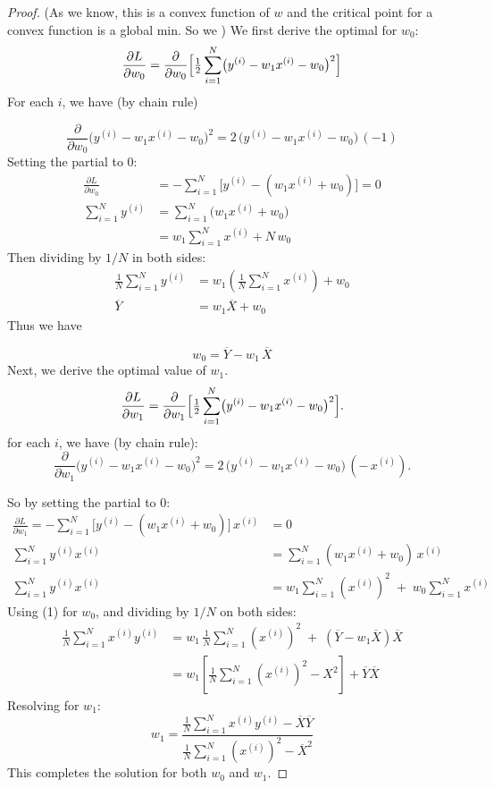 \documentclass[lang=cn,11pt]{elegantbook}
\begin{document}
\begin{proof}
(As we know, this is a convex function of $w$ and the critical point for a convex function is a global min. So we )
We first derive the optimal for $w_0$:
\[
\frac{\partial L}{\partial w_0}
= \frac{\partial}{\partial w_0}
   \Bigl[
       \tfrac{1}{2}\sum_{i=1}^N \bigl(y^{(i)} - w_1 x^{(i)} - w_0\bigr)^2
   \Bigr]
\]
For each \(i\), we have (by chain rule)

\[
\frac{\partial}{\partial w_0}
\bigl(y^{(i)} - w_1 x^{(i)} - w_0\bigr)^2
= 2\,\bigl(y^{(i)} - w_1 x^{(i)} - w_0\bigr)\,(-1)
\]
Setting the partial to 0:
\begin{align}
    \frac{\partial L}{\partial w_0}
&= -\sum_{i=1}^N \bigl[y^{(i)} - (w_1 x^{(i)} + w_0)\bigr] = 0 \\
\sum_{i=1}^N y^{(i)} 
&= \sum_{i=1}^N \bigl(w_1 x^{(i)} + w_0\bigr)\\
& = w_1 \sum_{i=1}^N x^{(i)} + N\,w_0
\end{align}
Then dividing by $1/N$ in both sides:
\begin{align}
    \frac{1}{N}\sum_{i=1}^N y^{(i)} 
&= w_1 (\frac{1}{N}\sum_{i=1}^N x^{(i)}) + w_0 \\
\overline{Y} &=     w_1   \overline{X} + w_0
\end{align}
Thus we have 

\[
w_0 = \overline{Y} - w_1 \, \overline{X}
\tag{1}
\]
Next, we derive the optimal value of $w_1$.
\[
\frac{\partial L}{\partial w_1}
= \frac{\partial}{\partial w_1}
   \Bigl[
       \tfrac{1}{2}\sum_{i=1}^N \bigl(y^{(i)} - w_1 x^{(i)} - w_0\bigr)^2
   \Bigr].
\]
for each \(i\), we have (by chain rule):
\[
\frac{\partial}{\partial w_1}
\bigl(y^{(i)} - w_1 x^{(i)} - w_0\bigr)^2
= 2\,\bigl(y^{(i)} - w_1 x^{(i)} - w_0\bigr)\,(-\,x^{(i)}).
\]

So by setting the partial to 0:
\begin{align}
    \frac{\partial L}{\partial w_1}
= -\sum_{i=1}^N 
    \bigl[y^{(i)} - (w_1 x^{(i)} + w_0)\bigr] \, x^{(i)} &= 0\\
\sum_{i=1}^N y^{(i)} x^{(i)}
&= \sum_{i=1}^N (w_1 x^{(i)} + w_0)\, x^{(i)} \\
\sum_{i=1}^N y^{(i)} x^{(i)}
&= w_1 \sum_{i=1}^N (x^{(i)})^2 
  \;+\; w_0 \sum_{i=1}^N x^{(i)}
\end{align}
Using (1) for $w_0$, and dividing by $1/N$ on both sides:
\begin{align}
\frac{1}{N}\sum_{i=1}^N x^{(i)} y^{(i)}
& = w_1 \,\frac{1}{N}\sum_{i=1}^N (x^{(i)})^2 
  \;+\; (\overline{Y} - w_1 \overline{X})\overline{X} \\
&=  w_1 \left[\frac{1}{N}\sum_{i=1}^N (x^{(i)})^2 - X^2\right]
  + \overline{Y} \overline{X}
\end{align}
Resolving for \(w_1\):
\[
w_1 
= \frac{
   \frac{1}{N}\sum_{i=1}^N x^{(i)} y^{(i)} - \overline{X} \overline{Y}
}{
   \frac{1}{N}\sum_{i=1}^N (x^{(i)})^2 - \overline{X}^2
}
\tag{2}
\]
This completes the solution for both $w_0$ and $w_1$.
\end{proof}
\end{document}
